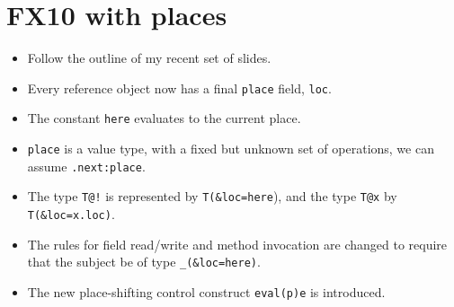 \documentclass{article}
\def\FXten{{\sf FX10}}
\begin{document}
\section{\FXten{} with places}

{\em
  \begin{itemize}
    \item Follow the outline of my recent set of slides.
    \item Every reference object now has a final {\tt place} field, {\tt loc}.
    \item The constant {\tt here} evaluates to the current place.
    \item {\tt place} is a value type, with a fixed but unknown set of
      operations, we can assume {\tt .next:place}.
    \item The type {\tt T@!} is represented by {\tt T(\&loc=here}), and
      the type {\tt T@x} by {\tt T(\&loc=x.loc)}.
    \item The rules for field read/write and method invocation are changed to require that
      the subject be of type {\tt \_(\&loc=here)}.
    \item The new place-shifting control construct {\tt eval(p)e} is introduced.
  \end{itemize}
}





\appendix
\end{document}
